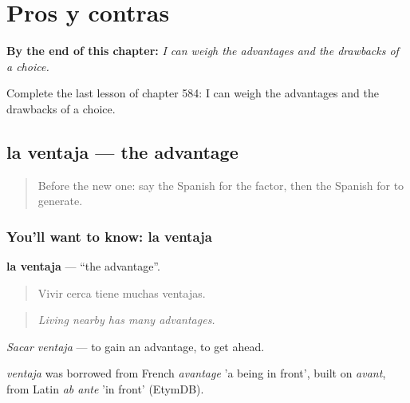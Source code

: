 
\chapter{Pros y contras}
\label{ch:es-pros-y-contras}

\begin{chapteropening}
\textbf{By the end of this chapter:} \emph{I can weigh the advantages and the drawbacks of a choice.}

Complete the last lesson of chapter 584: I can weigh the advantages and the drawbacks of a choice.
\end{chapteropening}

\section[la ventaja]{la ventaja — the advantage}

\label{lesson:ES-C584-ventaja}



\begin{quote}
Before the new one: say the Spanish for the factor, then the Spanish for to generate.
\end{quote}

\subsection*{You'll want to know: la ventaja}
\textbf{la ventaja} — \textquotedblleft{}the advantage\textquotedblright{}.

\begin{quote}
Vivir cerca tiene muchas ventajas.
\end{quote}

\begin{quote}
\emph{Living nearby has many advantages.}
\end{quote}

\emph{Sacar ventaja} — to gain an advantage, to get ahead.

\begin{cousinweb}
\emph{ventaja} was borrowed from French \emph{avantage} 'a being in front', built on \emph{avant}, from Latin \emph{ab ante} 'in front' (EtymDB).
\end{cousinweb}

